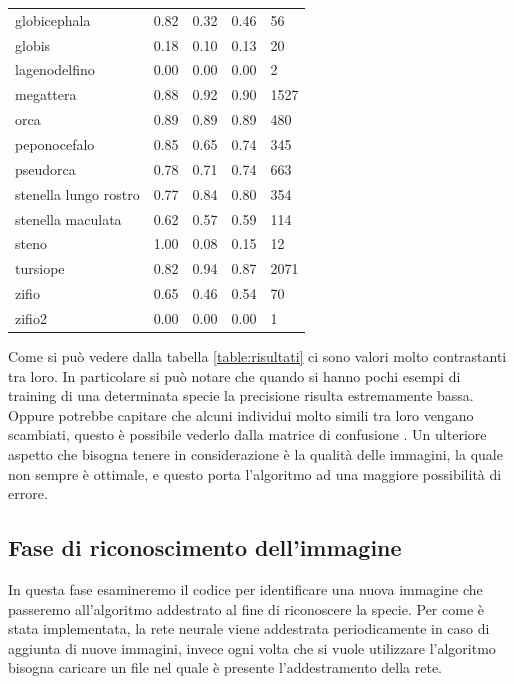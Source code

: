 \documentclass[a4paper,final,12pt]{report}
\begin{document}
\begin{longtable}{p{}p{}p{}p{}p{}}
globicephala & 0.82 & 0.32 & 0.46 & 56 \\
globis & 0.18 & 0.10 & 0.13 & 20 \\
lagenodelfino & 0.00 & 0.00 & 0.00 & 2 \\
megattera & 0.88 & 0.92 & 0.90 & 1527 \\
orca & 0.89 & 0.89 & 0.89 & 480 \\
peponocefalo & 0.85 & 0.65 & 0.74 & 345 \\
pseudorca & 0.78 & 0.71 & 0.74 & 663 \\
stenella lungo rostro & 0.77 & 0.84 & 0.80 & 354 \\
stenella maculata & 0.62 & 0.57 & 0.59 & 114 \\
steno & 1.00 & 0.08 & 0.15 & 12 \\
tursiope & 0.82 & 0.94 & 0.87 & 2071 \\
zifio & 0.65 & 0.46 & 0.54 & 70 \\
zifio2 & 0.00 & 0.00 & 0.00 & 1 \\
\end{longtable}

Come si può vedere dalla tabella \ref{table:risultati} ci sono valori molto contrastanti tra loro. In particolare si può notare che quando si hanno pochi esempi di training di una determinata specie la precisione risulta estremamente bassa. Oppure potrebbe capitare che alcuni individui molto simili tra loro vengano scambiati, questo è possibile vederlo dalla matrice di confusione \label{figura:matconf}. Un ulteriore aspetto che bisogna tenere in considerazione è la qualità delle immagini, la quale non sempre è ottimale, e questo porta l'algoritmo ad una maggiore possibilità di errore.

\subsection{Fase di riconoscimento dell'immagine}
In questa fase esamineremo il codice per identificare una nuova immagine che passeremo all'algoritmo addestrato al fine di riconoscere la specie. Per come è stata implementata, la rete neurale viene addestrata periodicamente in caso di aggiunta di nuove immagini, invece ogni volta che si vuole utilizzare l'algoritmo bisogna caricare un file nel quale è presente l'addestramento della rete.
\end{document}
